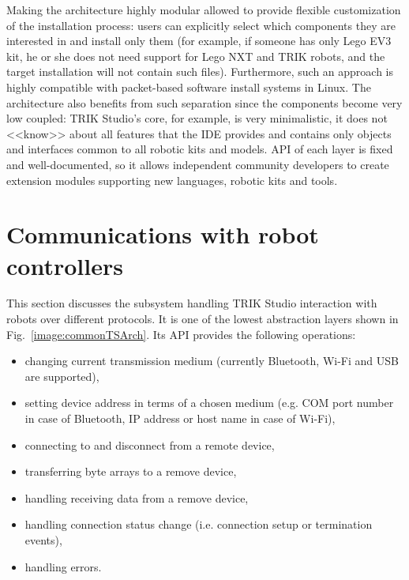\documentclass[conference]{IEEEtran}
\begin{document}
Making the architecture highly modular allowed to provide flexible customization of the installation process: users can explicitly select which components they are interested in and install only them (for example, if someone has only Lego EV3 kit, he or she does not need support for Lego NXT and TRIK robots, and the target installation will not contain such files). Furthermore, such an approach is highly compatible with packet-based software install systems in Linux. The architecture also benefits from such separation since the components become very low coupled: TRIK Studio's core, for example, is very minimalistic, it does not <<know>> about all features that the IDE provides and contains only objects and interfaces common to all robotic kits and models. API of each layer is fixed and well-documented, so it allows independent community developers to create extension modules supporting new languages, robotic kits and tools.

\section{Communications with robot controllers}
\label{chapter:communications}

This section discusses the subsystem handling TRIK Studio interaction with robots over different protocols. It is one of the lowest abstraction layers shown in Fig.~\ref{image:commonTSArch}. Its API provides the following operations: 

\begin{itemize}
    \item changing current transmission medium (currently Bluetooth, Wi-Fi and USB are supported),
    \item setting device address in terms of a chosen medium (e.g. COM port number in case of Bluetooth, IP address or host name in case of Wi-Fi),
    \item connecting to and disconnect from a remote device,
    \item transferring byte arrays to a remove device,
    \item handling receiving data from a remove device,
    \item handling connection status change (i.e. connection setup or termination events),
    \item handling errors.
\end{itemize}
\end{document}
